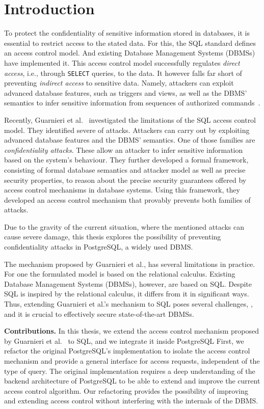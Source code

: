 \section{Introduction}
To protect the confidentiality of sensitive information stored in databases, it is essential to restrict access to the stated data.
%
For this, the SQL standard defines an access control model. And existing Database Management Systems (DBMSs) have implemented it. 
%
This access control model successfully regulates \emph{direct access}, i.e., through \texttt{SELECT} queries, to the data. It however falls far short of preventing \emph{indirect access} to sensitive data.
%
Namely, attackers can exploit advanced database features, such as triggers and views, as well as the DBMS' semantics to infer sensitive information from sequences of authorized commands~\cite{guarnieri2016strong}.
%

Recently, Guarnieri et al.~\cite{guarnieri2016strong} investigated the limitations of the SQL access control model. 
%
They identified severe of attacks. Attackers can carry out by exploiting advanced database features and the DBMS' semantics.
%
One of those families are \emph{confidentiality attacks}. These allow an attacker to infer sensitive information based on the system's behaviour.
%
They further developed a formal framework, consisting of formal database semantics and attacker model as well as precise security properties, to reason about the precise security guarantees offered by access control mechanisms in database systems.
%
Using this framework, they developed an access control mechanism that provably prevents both families of attacks.

Due to the gravity of the current situation, where the mentioned attacks can cause severe damage, this thesis explores the possibility of preventing confidentiality attacks in PostgreSQL, a widely used DBMS.

The mechanism proposed by Guarnieri et al., has several limitations in practice.
%
For one the formulated model is based on the relational calculus. 
%
Existing Database Management Systems (DBMSs), however, are based on SQL.
%
Despite SQL is inspired by the relational calculus, it differs from it in significant ways.
%
Thus, extending Guarnieri et al.'s mechanism to SQL poses several challenges, , and it is crucial to effectively secure state-of-the-art DBMSs.

\smallskip
\noindent
{\bf Contributions.}
%
In this thesis, we extend  the access control mechanism proposed by Guarnieri et al.~\cite{guarnieri2016strong} to SQL, and we integrate it inside PostgreSQL
%
First, we refactor the original PostgreSQL's implementation to isolate the access control mechanism and provide a general interface for access requests, independent of the type of query.
%
The original implementation requires a deep understanding of the backend architecture of PostgreSQL to be able to extend and improve the current access control algorithm.
%
Our refactoring provides the possibility of improving and extending access control without interfering with the internals of the DBMS.

